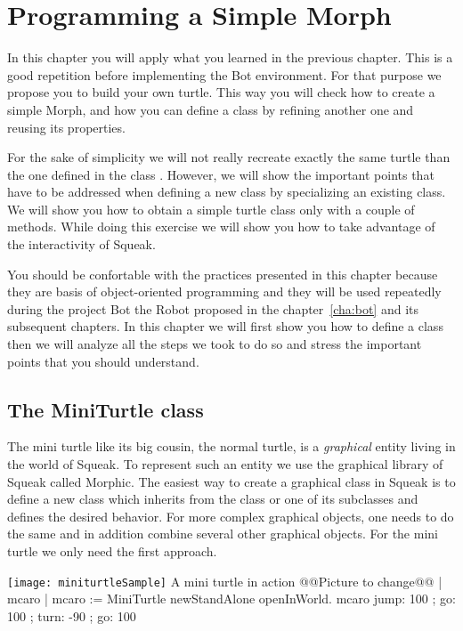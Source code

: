 \ifx\wholebook\relax\else



\fi

\chapter{Programming a Simple Morph}\label{cha:miniturtle}

In this chapter you will apply what you learned in the previous
chapter.  This is a good repetition before implementing the Bot
environment.  For that purpose we propose you to build your own
turtle. This way you will check how to create a simple Morph, and how
you can define a class by refining another one and reusing its
properties.

For the sake of simplicity we will not really recreate exactly the
same turtle than the one defined in the class . However, we
will show the important points that have to be addressed when defining
a new class by specializing an existing class. We will show you how to
obtain a simple turtle class only with a couple of methods. While
doing this exercise we will show you how to take advantage of the
interactivity of Squeak.

You should be confortable with the practices presented in this chapter
because they are basis of object-oriented programming and they will be
used repeatedly during the project Bot the Robot proposed in the
chapter~\ref{cha:bot} and its subsequent chapters. In this chapter we
will first show you how to define a class then we will analyze all the
steps we took to do so and stress the important points that you should
understand.

\section{The MiniTurtle class}
The mini turtle like its big cousin, the normal turtle, is a
\emph{graphical} entity living in the world of Squeak. To represent 
such an entity we use the graphical library of Squeak called
Morphic. The easiest way to create a graphical class in Squeak is to
define a new class which inherits from the class  or one of
its subclasses and defines the desired behavior. For more complex
graphical objects, one needs to do the same and in addition combine
several other graphical objects. For the mini turtle we only need the
first approach.


\begin{scriptfigwithsize}{\texttt{[image: miniturtleSample]}}
{A mini turtle in action @@Picture to change@@}\label{scr:miniturtle}
| mcaro |
mcaro := MiniTurtle newStandAlone 
           openInWorld.
mcaro jump: 100 ; go: 100 ; 
      turn: -90 ; go: 100
\end{scriptfigwithsize}

